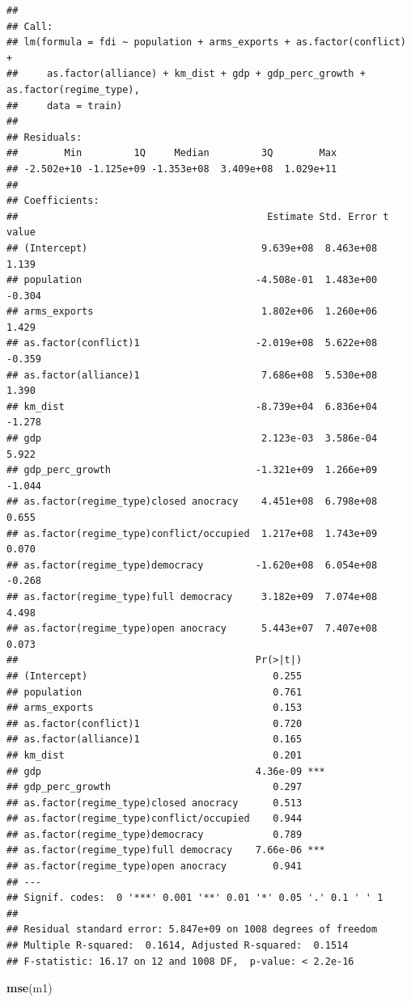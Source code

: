 \documentclass[11pt,]{article}
\newenvironment{Shaded}{\begin{snugshade}}{\end{snugshade}}
\newcommand{\KeywordTok}[1]{\textcolor[rgb]{0.13,0.29,0.53}{\textbf{#1}}}
\newcommand{\NormalTok}[1]{#1}
\begin{document}
\begin{verbatim}
## 
## Call:
## lm(formula = fdi ~ population + arms_exports + as.factor(conflict) + 
##     as.factor(alliance) + km_dist + gdp + gdp_perc_growth + as.factor(regime_type), 
##     data = train)
## 
## Residuals:
##        Min         1Q     Median         3Q        Max 
## -2.502e+10 -1.125e+09 -1.353e+08  3.409e+08  1.029e+11 
## 
## Coefficients:
##                                           Estimate Std. Error t value
## (Intercept)                              9.639e+08  8.463e+08   1.139
## population                              -4.508e-01  1.483e+00  -0.304
## arms_exports                             1.802e+06  1.260e+06   1.429
## as.factor(conflict)1                    -2.019e+08  5.622e+08  -0.359
## as.factor(alliance)1                     7.686e+08  5.530e+08   1.390
## km_dist                                 -8.739e+04  6.836e+04  -1.278
## gdp                                      2.123e-03  3.586e-04   5.922
## gdp_perc_growth                         -1.321e+09  1.266e+09  -1.044
## as.factor(regime_type)closed anocracy    4.451e+08  6.798e+08   0.655
## as.factor(regime_type)conflict/occupied  1.217e+08  1.743e+09   0.070
## as.factor(regime_type)democracy         -1.620e+08  6.054e+08  -0.268
## as.factor(regime_type)full democracy     3.182e+09  7.074e+08   4.498
## as.factor(regime_type)open anocracy      5.443e+07  7.407e+08   0.073
##                                         Pr(>|t|)    
## (Intercept)                                0.255    
## population                                 0.761    
## arms_exports                               0.153    
## as.factor(conflict)1                       0.720    
## as.factor(alliance)1                       0.165    
## km_dist                                    0.201    
## gdp                                     4.36e-09 ***
## gdp_perc_growth                            0.297    
## as.factor(regime_type)closed anocracy      0.513    
## as.factor(regime_type)conflict/occupied    0.944    
## as.factor(regime_type)democracy            0.789    
## as.factor(regime_type)full democracy    7.66e-06 ***
## as.factor(regime_type)open anocracy        0.941    
## ---
## Signif. codes:  0 '***' 0.001 '**' 0.01 '*' 0.05 '.' 0.1 ' ' 1
## 
## Residual standard error: 5.847e+09 on 1008 degrees of freedom
## Multiple R-squared:  0.1614, Adjusted R-squared:  0.1514 
## F-statistic: 16.17 on 12 and 1008 DF,  p-value: < 2.2e-16
\end{verbatim}

\begin{Shaded}
\begin{Highlighting}[]
\KeywordTok{mse}\NormalTok{(m1)}
\end{Highlighting}
\end{Shaded}
\end{document}
